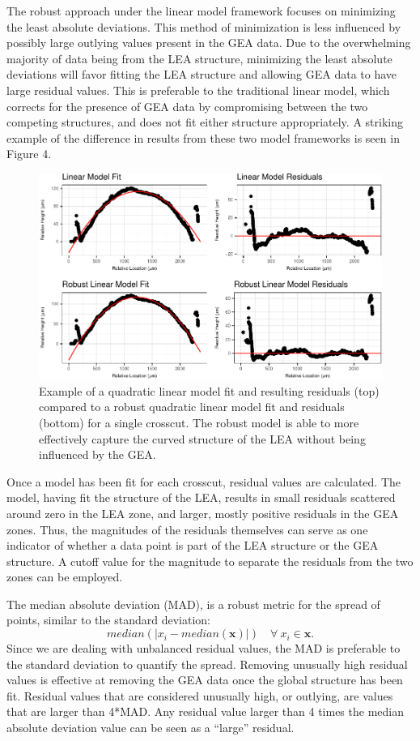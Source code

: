 \documentclass[]{article}
\begin{document}
The robust approach under the linear model framework focuses on
minimizing the least absolute deviations. This method of minimization is
less influenced by possibly large outlying values present in the GEA
data. Due to the overwhelming majority of data being from the LEA
structure, minimizing the least absolute deviations will favor fitting
the LEA structure and allowing GEA data to have large residual values.
This is preferable to the traditional linear model, which corrects for
the presence of GEA data by compromising between the two competing
structures, and does not fit either structure appropriately. A striking
example of the difference in results from these two model frameworks is
seen in Figure 4.

\begin{figure}
\centering
\includegraphics{writeup_files/figure-latex/unnamed-chunk-3-1.pdf}
\caption{Example of a quadratic linear model fit and resulting residuals
(top) compared to a robust quadratic linear model fit and residuals
(bottom) for a single crosscut. The robust model is able to more
effectively capture the curved structure of the LEA without being
influenced by the GEA.}
\end{figure}

Once a model has been fit for each crosscut, residual values are
calculated. The model, having fit the structure of the LEA, results in
small residuals scattered around zero in the LEA zone, and larger,
mostly positive residuals in the GEA zones. Thus, the magnitudes of the
residuals themselves can serve as one indicator of whether a data point
is part of the LEA structure or the GEA structure. A cutoff value for
the magnitude to separate the residuals from the two zones can be
employed.

The median absolute deviation (MAD), is a robust metric for the spread
of points, similar to the standard deviation:
\[median(|x_i- median(\mathbf{x})|) \quad \forall\ x_i \in \mathbf{x}.\]
Since we are dealing with unbalanced residual values, the MAD is
preferable to the standard deviation to quantify the spread. Removing
unusually high residual values is effective at removing the GEA data
once the global structure has been fit. Residual values that are
considered unusually high, or outlying, are values that are larger than
4*MAD. Any residual value larger than 4 times the median absolute
deviation value can be seen as a ``large'' residual.
\end{document}
